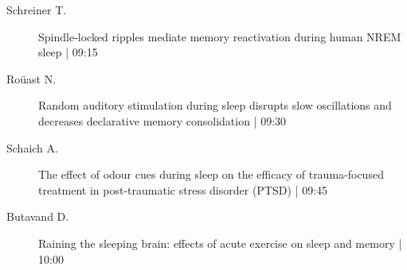 \begin{symposium}
\begin{description}
                \item [ Schreiner T.] Spindle-locked ripples mediate memory reactivation during human NREM sleep \textcolor{mygray}{ | 09:15}    
                
                \item [ Roüast N.] Random auditory stimulation during sleep disrupts slow oscillations and decreases declarative memory consolidation \textcolor{mygray}{ | 09:30}    
                
                \item [ Schaich A.] The effect of odour cues during sleep on the efficacy of trauma-focused treatment in post-traumatic stress disorder (PTSD) \textcolor{mygray}{ | 09:45}    
                
                \item [ Butavand D.] Raining the sleeping brain: effects of acute exercise on sleep and memory \textcolor{mygray}{ | 10:00}    
                
            \end{description} 
            \end{symposium}
            